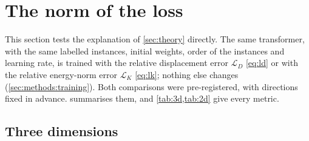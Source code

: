 \section{The norm of the loss}\label{sec:norm}

This section tests the explanation of \cref{sec:theory} directly. The same transformer, with
the same labelled instances, initial weights, order of the instances and learning rate, is
trained with the relative displacement error $\mathcal{L}_D$ \eqref{eq:ld} or with the
relative energy-norm error $\mathcal{L}_K$ \eqref{eq:lk}; nothing else changes
(\cref{sec:methods:training}). Both comparisons were pre-registered, with directions fixed
in advance.  summarises them, and \cref{tab:3d,tab:2d} give every
metric.

\subsection{Three dimensions}\label{sec:norm:three}



